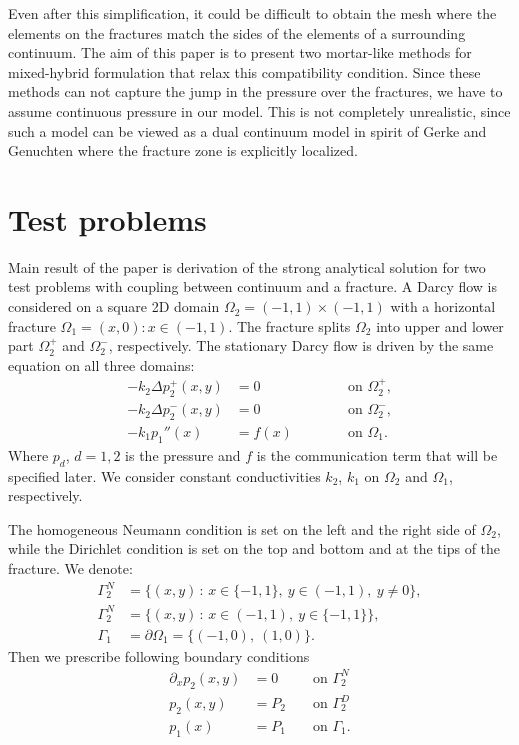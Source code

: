 \documentclass[a4paper,10pt]{article}
\def\Laplace{\Delta}
\def\prtl{\partial} %
\begin{document}
Even after this simplification, it could be difficult to obtain the mesh where the elements on the fractures match the sides of 
the elements of a surrounding continuum. The aim of this paper is to present two mortar-like methods for mixed-hybrid formulation
that relax this compatibility condition. Since these methods can not capture the jump in the pressure over the fractures, we have
to assume continuous pressure in our model. This is not completely unrealistic, since such a model can be viewed 
as a dual continuum model
in spirit of Gerke and Genuchten \cite{GerkeGenuchten1993a} where the fracture zone is explicitly localized. 




\section{Test problems}
Main result of the paper is derivation of the strong analytical solution for two test problems with coupling between continuum and a fracture.
A Darcy flow is considered  on a square 2D domain $\Omega_2 = (-1,1)\times(-1,1)$
with a horizontal fracture $\Omega_1 = { (x,0) : x\in (-1,1)}$. The fracture splits $\Omega_2$ into upper and 
lower part $\Omega_2^+$ and $\Omega_2^-$, respectively.
The stationary Darcy flow is driven by the same equation on all three domains:
\begin{align}
  \label{eq:Darcy_common}
  -k_2 \Laplace p^+_2(x,y) &= 0 \qquad &&\text{ on }\Omega_2^+,\\
  -k_2 \Laplace p^-_2(x,y) &= 0 \qquad &&\text{ on }\Omega_2^-,\\
  -k_1 p_1''(x) &= f(x) \qquad &&\text{ on }\Omega_1.
  \label{eq:Darcy_common_c}
\end{align}
Where $p_d$, $d=1,2$ is the pressure and $f$ is the communication term that will be specified later. 
We consider constant conductivities $k_2$, $k_1$ on $\Omega_2$ and $\Omega_1$, respectively.

The homogeneous Neumann condition is set on the left and the right side of $\Omega_2$,
while the Dirichlet condition is set on the top and bottom and at the tips of the fracture.
We denote:
\begin{align*}
   \Gamma^N_2 &= \{(x,y)\, :\, x\in\{-1, 1\},\ y\in (-1, 1),\ y\ne 0\},\\
   \Gamma^N_2 &= \{(x,y)\, :\, x\in (-1, 1),\ y\in \{-1, 1\}\},\\
   \Gamma_1   &= \prtl \Omega_1 = \{(-1, 0),\ (1, 0)\}. 
\end{align*}
Then we prescribe following boundary conditions
\begin{align}
  \label{eq:bc_common}
  \prtl_x p_2(x,y) &= 0  &&\text{ on } \Gamma_2^N\\
  p_2(x,y) &= P_2        &&\text{ on } \Gamma_2^D\\
  p_1(x) &= P_1          &&\text{ on } \Gamma_1.
  \label{eq:bc_1}
\end{align}
\end{document}
